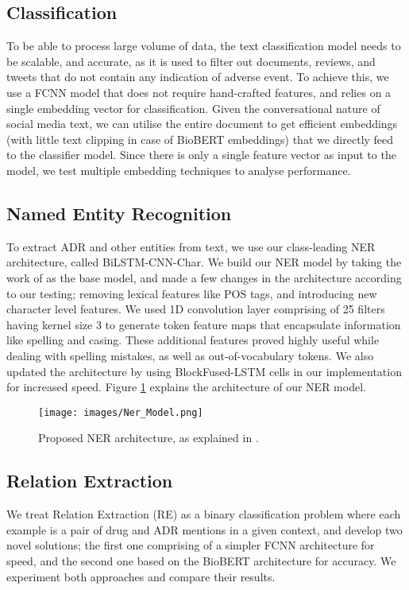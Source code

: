 \documentclass[letterpaper]{article}
\begin{document}
\subsection{Classification}
To be able to process large volume of data, the text classification model needs to be scalable, and accurate, as it is used to filter out documents, reviews, and tweets that do not contain any indication of adverse event. To achieve this, we use a FCNN model that does not require  hand-crafted features, and relies on a single embedding vector for classification. Given the conversational nature of social media text, we can utilise the entire document to get efficient embeddings (with little text clipping in case of BioBERT embeddings) that we directly feed to the classifier model. Since there is only a single feature vector as input to the model, we test multiple embedding techniques to analyse performance.

\subsection{Named Entity Recognition}
To extract ADR and other entities from text, we use our class-leading NER architecture, called BiLSTM-CNN-Char. We build our NER model by taking the work of \cite{DBLP:journals/corr/ChiuN15} as the base model, and made a few changes in the architecture according to our testing; removing lexical features like POS tags, and introducing new character level features. We used 1D convolution layer comprising of 25 filters having kernel size 3 to generate token feature maps that encapsulate information like spelling and casing. These additional features proved highly useful while dealing with spelling mistakes, as well as out-of-vocabulary tokens. We also updated the architecture by using BlockFused-LSTM cells in our implementation for increased speed. Figure \ref{fig:ner_model} explains the architecture of our NER model.

\begin{figure}[h!]
  \texttt{[image: images/Ner\_Model.png]}
  \caption{Proposed NER architecture, as explained in  \cite{DBLP:journals/corr/abs-2011-06315}.}
  \label{fig:ner_model}
\end{figure}

\subsection{Relation Extraction}

We treat Relation Extraction (RE) as a binary classification problem where each example is a pair of drug and ADR mentions in a given context, and develop two novel solutions; the first one comprising of a simpler FCNN architecture for speed, and the second one based on the BioBERT architecture for accuracy. We experiment both approaches and compare their results. 
\end{document}

